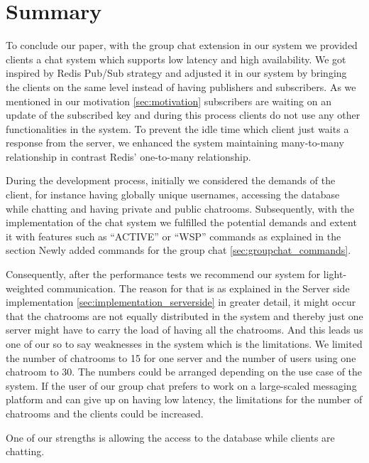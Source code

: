 \section{Summary}
\label{sec:summary}

To conclude our paper, with the group chat extension in our system we provided clients a chat system which supports low latency and high availability. We got inspired by Redis Pub/Sub strategy and adjusted it in our system by bringing the clients on the same level instead of having publishers and subscribers. As we mentioned in our motivation \ref{sec:motivation} subscribers are waiting on an update of the subscribed key and during this process clients do not use any other functionalities in the system. To prevent the idle time which client just waits a response from the server, we enhanced the system maintaining many-to-many relationship in contrast Redis’ one-to-many relationship.

During the development process, initially we considered the demands of the client, for instance having globally unique usernames, accessing the database while chatting and having private and public chatrooms. Subsequently, with the implementation of the chat system we fulfilled the potential demands and extent it with features such as “ACTIVE” or “WSP” commands as explained in the section Newly added commands for the group chat \ref{sec:groupchat_commands}.

Consequently, after the performance tests we recommend our system for light-weighted communication. The reason for that is as explained in the Server side implementation \ref{sec:implementation_serverside} in greater detail, it might occur that the chatrooms are not equally distributed in the system and thereby just one server might have to carry the load of having all the chatrooms. And this leads us one of our so to say weaknesses in the system which is the limitations. We limited the number of chatrooms to 15 for one server and the number of users using one chatroom to 30. The numbers could be arranged depending on the use case of the system. If the user of our group chat prefers to work on a large-scaled messaging platform and can give up on having low latency, the limitations for the number of chatrooms and the clients could be increased.

One of our strengths is allowing the access to the database while clients are chatting.

